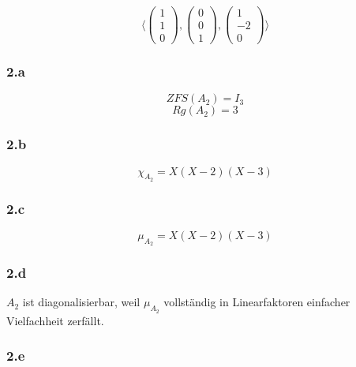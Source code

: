 \documentclass[10pt,a4paper]{article}
\begin{document}
\begin{equation}
\langle
\begin{pmatrix}
1\\1\\0
\end{pmatrix},
\begin{pmatrix}
0\\0\\1
\end{pmatrix},
\begin{pmatrix}
1\\-2\\0
\end{pmatrix}
\rangle
\end{equation}

\subsubsection*{2.a}

\begin{equation}
ZFS(A_{2}) = I_{3}
\end{equation}
\begin{equation}
Rg(A_{2}) = 3
\end{equation}

\subsubsection*{2.b}

\begin{equation}
\chi_{A_{2}} = X(X-2)(X-3)
\end{equation}

\subsubsection*{2.c}

\begin{equation}
\mu_{A_{2}} = X(X-2)(X-3)
\end{equation}

\subsubsection*{2.d}

$A_{2}$ ist diagonalisierbar, weil $\mu_{A_{2}}$ vollständig in Linearfaktoren einfacher Vielfachheit zerfällt.

\subsubsection*{2.e}
\end{document}
